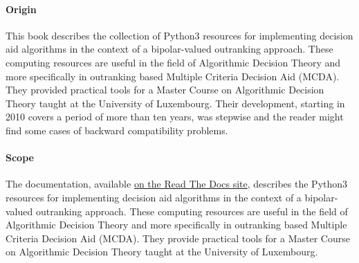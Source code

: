 %
%

\preface





\paragraph{Origin}

This book describes the \Digraph collection of Python3 resources for implementing decision aid algorithms in the context of a bipolar-valued outranking approach. These computing resources are useful in the field of Algorithmic Decision Theory and more specifically in outranking based Multiple Criteria Decision Aid (MCDA). They provided practical tools for a Master Course on Algorithmic Decision Theory taught at the University of Luxembourg. Their development, starting in 2010 covers a period of more than ten years, was stepwise and the reader might find some cases of backward compatibility problems.

\paragraph{Scope}

The \Digraph documentation, available \href{https://digraph3.readthedocs.io/en/latest/}{on the Read The Docs site}, describes the Python3 resources for implementing decision aid algorithms in the context of a bipolar-valued outranking approach. These computing resources are useful in the field of Algorithmic Decision Theory and more specifically in outranking based Multiple Criteria Decision Aid (MCDA). They provide practical tools for a Master Course on Algorithmic Decision Theory taught at the University of Luxembourg.


